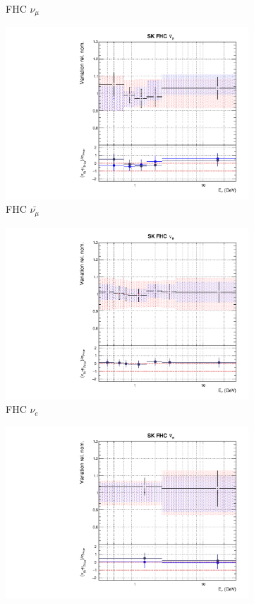 \begin{figure}[t]
\begin{subfigure}{0.42\textwidth}
  \caption{\SK FHC $\nu_{\mu}$}
\end{subfigure}
\begin{subfigure}{0.42\textwidth}
  \centering
  \includegraphics[width=0.75\linewidth]{figs/rhcmpdat28flux_9}
  \caption{\SK FHC $\bar{\nu_{\mu}}$}
\end{subfigure}
\begin{subfigure}{0.42\textwidth}
  \centering
  \includegraphics[width=0.75\linewidth]{figs/rhcmpdat248flux_10}
  \caption{\SK FHC $\nu_e$}
\end{subfigure}
\begin{subfigure}{0.42\textwidth}
  \centering
  \includegraphics[width=0.75\linewidth]{figs/rhcmpdat28flux_11}

\end{subfigure}
\end{figure}
